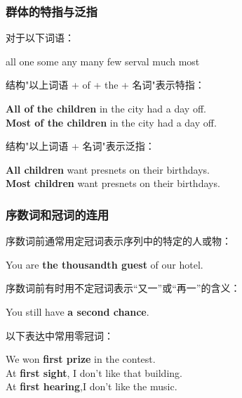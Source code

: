 \documentclass[UTF8]{ctexart}
\newcommand{\littf}[1]{{\hspace{3pt}\ttfamily #1}}
\begin{document}
\subsubsection{群体的特指与泛指}
    对于以下词语：
    \begin{center}
        \ttfamily
        all one some any many few serval much most\\[6mm]
    \end{center}
    结构\littf{"\hspace{0pt}以上词语 + of + the + 名词"}表示特指：
    \begin{center}
        \large\ttfamily
        \textbf{All of the children} in the city had a day off.\\[3mm]
        \textbf{Most of the children} in the city had a day off.\\[6mm]
    \end{center}
    结构\littf{"\hspace{0pt}以上词语 + 名词"}表示泛指：
    \begin{center}
        \large\ttfamily
        \textbf{All children} want presnets on their birthdays.\\[3mm]
        \textbf{Most children} want presnets on their birthdays.
    \end{center}

\newpage

\subsubsection{序数词和冠词的连用}
    序数词前通常用定冠词表示序列中的特定的人或物：
    \begin{center}
        \large\ttfamily
        You are \textbf{the thousandth guest} of our hotel.\\[4mm]
    \end{center}
    序数词前有时用不定冠词表示“又一”或“再一”的含义：
    \begin{center}
        \large\ttfamily
        You still have \textbf{a second chance}.\\[4mm]
    \end{center}
    以下表达中常用零冠词：
    \begin{center}
        \large\ttfamily
        We won \textbf{first prize} in the contest.\\[2mm]
        At \textbf{first sight}, I don't like that building.\\[3mm]
        At \textbf{first hearing},I don't like the music.
    \end{center}\vspace{5pt}
\end{document}

